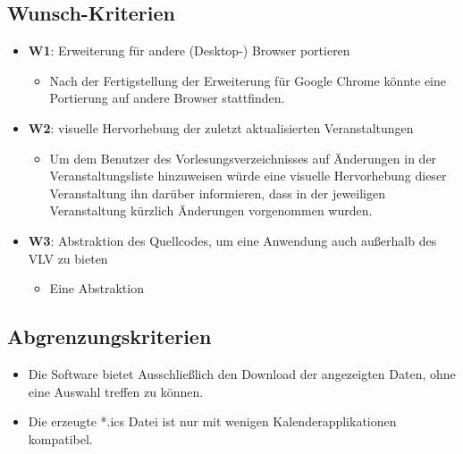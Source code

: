 \documentclass[11pt]{report}
\begin{document}
\subsection*{Wunsch-Kriterien}
\begin{itemize}
\item \textbf{W1}: Erweiterung für andere (Desktop-) Browser portieren
    \begin{itemize}
    \item Nach der Fertigstellung der Erweiterung für Google Chrome könnte eine Portierung auf andere Browser stattfinden.
    \end{itemize}
\item \textbf{W2}: visuelle Hervorhebung der zuletzt aktualisierten Veranstaltungen
    \begin{itemize}
    \item Um dem Benutzer des Vorlesungsverzeichnisses auf \"Anderungen in der Veranstaltungsliste hinzuweisen würde eine visuelle Hervorhebung dieser Veranstaltung ihn darüber informieren, dass in der jeweiligen Veranstaltung k\"urzlich \"Anderungen vorgenommen wurden.
    \end{itemize}
\item \textbf{W3}: Abstraktion des Quellcodes, um eine Anwendung auch außerhalb des VLV zu bieten
    \begin{itemize}
    \item Eine Abstraktion
    \end{itemize}
\end{itemize}

\subsection*{Abgrenzungskriterien}
\begin{itemize}
\item Die Software bietet Ausschließlich den Download der angezeigten Daten, ohne eine Auswahl treffen zu k\"onnen.
\item Die erzeugte *.ics Datei ist nur mit wenigen Kalenderapplikationen kompatibel.
\end{itemize}
\end{document}
